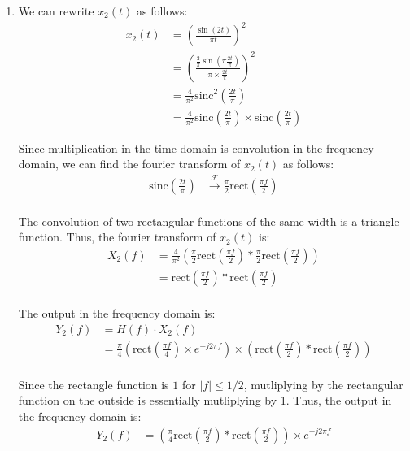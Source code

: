 \documentclass{article}
\begin{document}
\begin{enumerate}[label=2.\arabic*]
    \item We can rewrite $x_2(t)$ as follows:   
    \begin{align*}
        x_2(t) &= \left(\frac{\sin(2t)}{\pi t}\right)^2 \\
        &= \left(\frac{\frac{2}{\pi} \sin\left(\pi \frac{2t}{\pi}\right)}{\pi \times \frac{2t}{\pi}}\right)^2 \\
        &= \frac{4}{\pi^2} \text{sinc}^2\left(\frac{2t}{\pi}\right) \\
        &= \frac{4}{\pi^2} \text{sinc}\left(\frac{2t}{\pi}\right) \times \text{sinc}\left(\frac{2t}{\pi}\right)
    \end{align*}

    Since multiplication in the time domain is convolution in the frequency domain, we can find the fourier transform of $x_2(t)$ as follows:
    \begin{align*}
        \text{sinc}\left(\frac{2t}{\pi}\right) &\xrightarrow{\mathcal{F}} \frac{\pi}{2}\text{rect}\left(\frac{\pi f}{2}\right) \\
    \end{align*}

    The convolution of two rectangular functions of the same width is a triangle function. Thus, the fourier transform of $x_2(t)$ is:
    \begin{align*}
        X_2(f) &= \frac{4}{\pi^2}\left(
            \frac{\pi}{2}\text{rect}\left(\frac{\pi f}{2}\right) \ast \frac{\pi}{2}\text{rect}\left(\frac{\pi f}{2}\right)
        \right) \\
        &= \text{rect}\left(\frac{\pi f}{2}\right) \ast \text{rect}\left(\frac{\pi f}{2}\right) \\
    \end{align*}

    The output in the frequency domain is:
    \begin{align*}
        Y_2(f) &= H(f) \cdot X_2(f) \\
        &= \frac{\pi}{4}\left( \text{rect}\left(\frac{\pi f}{4}\right) \times e^{-j2\pi f}\right) \times \left(\text{rect}\left(\frac{\pi f}{2}\right) \ast \text{rect}\left(\frac{\pi f}{2}\right)\right) \\
    \end{align*}

    Since the rectangle function is $1$ for $|f| \leq 1/2$, mutliplying by the rectangular function on the outside is essentially mutliplying by 1. Thus, the output in the frequency domain is:
    \begin{align*}
        Y_2(f) &=  \left(\frac{\pi}{4}\text{rect}\left(\frac{\pi f}{2}\right) \ast \text{rect}\left(\frac{\pi f}{2}\right)\right) \times e^{-j2\pi f} \\
    \end{align*}


\end{enumerate}
\end{document}
